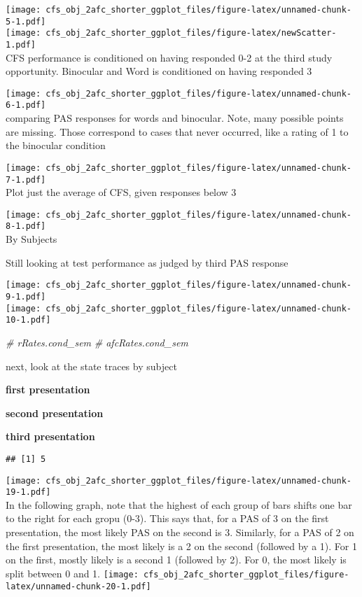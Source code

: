 \documentclass[]{article}
\newenvironment{Shaded}{\begin{snugshade}}{\end{snugshade}}
\newcommand{\CommentTok}[1]{\textcolor[rgb]{0.56,0.35,0.01}{\textit{{#1}}}}
\begin{document}
\texttt{[image: cfs\_obj\_2afc\_shorter\_ggplot\_files/figure-latex/unnamed-chunk-5-1.pdf]}\\
\texttt{[image: cfs\_obj\_2afc\_shorter\_ggplot\_files/figure-latex/newScatter-1.pdf]}\\

CFS performance is conditioned on having responded 0-2 at the third
study opportunity. Binocular and Word is conditioned on having responded
3

\texttt{[image: cfs\_obj\_2afc\_shorter\_ggplot\_files/figure-latex/unnamed-chunk-6-1.pdf]}\\

comparing PAS responses for words and binocular. Note, many possible
points are missing. Those correspond to cases that never occurred, like
a rating of 1 to the binocular condition

\texttt{[image: cfs\_obj\_2afc\_shorter\_ggplot\_files/figure-latex/unnamed-chunk-7-1.pdf]}\\

Plot just the average of CFS, given responses below 3

\texttt{[image: cfs\_obj\_2afc\_shorter\_ggplot\_files/figure-latex/unnamed-chunk-8-1.pdf]}\\

By Subjects

Still looking at test performance as judged by third PAS response

\texttt{[image: cfs\_obj\_2afc\_shorter\_ggplot\_files/figure-latex/unnamed-chunk-9-1.pdf]}\\

\texttt{[image: cfs\_obj\_2afc\_shorter\_ggplot\_files/figure-latex/unnamed-chunk-10-1.pdf]}\\

\begin{Shaded}
\begin{Highlighting}[]
\CommentTok{# rRates.cond_sem}
\CommentTok{# afcRates.cond_sem}
\end{Highlighting}
\end{Shaded}

next, look at the state traces by subject

\textbf{first presentation}

\textbf{second presentation}

\textbf{third presentation}

\begin{verbatim}
## [1] 5
\end{verbatim}

\texttt{[image: cfs\_obj\_2afc\_shorter\_ggplot\_files/figure-latex/unnamed-chunk-19-1.pdf]}\\
In the following graph, note that the highest of each group of bars
shifts one bar to the right for each gropu (0-3). This says that, for a
PAS of 3 on the first presentation, the most likely PAS on the second is
3. Similarly, for a PAS of 2 on the first presentation, the most likely
is a 2 on the second (followed by a 1). For 1 on the first, mostly
likely is a second 1 (followed by 2). For 0, the most likely is split
between 0 and 1.
\texttt{[image: cfs\_obj\_2afc\_shorter\_ggplot\_files/figure-latex/unnamed-chunk-20-1.pdf]}\\
\end{document}
